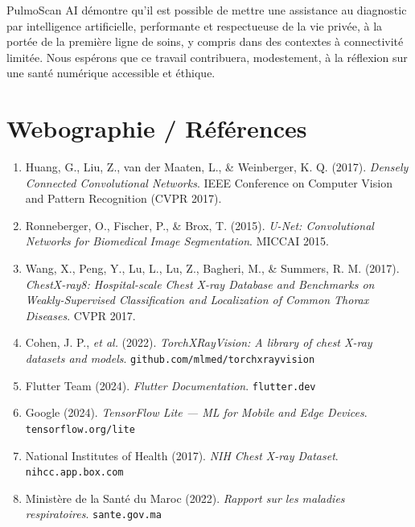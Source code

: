 \documentclass[12pt,a4paper]{report}
\begin{document}
\bigskip
PulmoScan AI démontre qu'il est possible de mettre une assistance au diagnostic par intelligence artificielle, performante et respectueuse de la vie privée, à la portée de la première ligne de soins, y compris dans des contextes à connectivité limitée. Nous espérons que ce travail contribuera, modestement, à la réflexion sur une santé numérique accessible et éthique.

\chapter*{Webographie / Références}

\begin{enumerate}
  \item Huang, G., Liu, Z., van der Maaten, L., \& Weinberger, K. Q. (2017). \textit{Densely Connected Convolutional Networks}. IEEE Conference on Computer Vision and Pattern Recognition (CVPR 2017).
  \item Ronneberger, O., Fischer, P., \& Brox, T. (2015). \textit{U-Net: Convolutional Networks for Biomedical Image Segmentation}. MICCAI 2015.
  \item Wang, X., Peng, Y., Lu, L., Lu, Z., Bagheri, M., \& Summers, R. M. (2017). \textit{ChestX-ray8: Hospital-scale Chest X-ray Database and Benchmarks on Weakly-Supervised Classification and Localization of Common Thorax Diseases}. CVPR 2017.
  \item Cohen, J. P., \textit{et al.} (2022). \textit{TorchXRayVision: A library of chest X-ray datasets and models}. \texttt{github.com/mlmed/torchxrayvision}
  \item Flutter Team (2024). \textit{Flutter Documentation}. \texttt{flutter.dev}
  \item Google (2024). \textit{TensorFlow Lite --- ML for Mobile and Edge Devices}. \texttt{tensorflow.org/lite}
  \item National Institutes of Health (2017). \textit{NIH Chest X-ray Dataset}. \texttt{nihcc.app.box.com}
  \item Ministère de la Santé du Maroc (2022). \textit{Rapport sur les maladies respiratoires}. \texttt{sante.gov.ma}
\end{enumerate}
\end{document}
